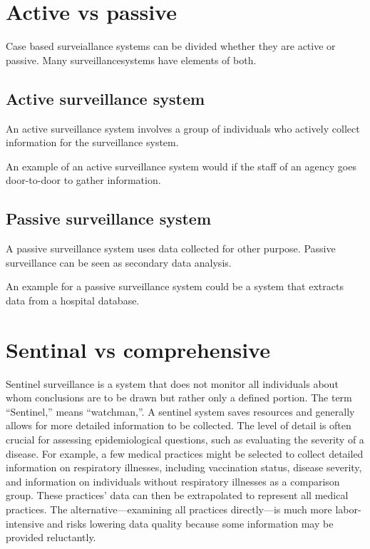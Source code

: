 \documentclass[
  letterpaper,
  DIV=11,
  numbers=noendperiod]{scrreprt}
\begin{document}
\chapter{Active vs passive}\label{active-vs-passive}

Case based surveiallance systems can be divided whether they are active
or passive. Many surveillancesystems have elements of both.

\section{Active surveillance system}\label{active-surveillance-system}

An active surveillance system involves a group of individuals who
actively collect information for the surveillance system.

An example of an active surveillance system would if the staff of an
agency goes door-to-door to gather information.

\section{Passive surveillance system}\label{passive-surveillance-system}

A passive surveillance system uses data collected for other purpose.
Passive surveillance can be seen as secondary data analysis.

An example for a passive surveillance system could be a system that
extracts data from a hospital database.

\chapter{Sentinal vs comprehensive}\label{sentinal-vs-comprehensive}

Sentinel surveillance is a system that does not monitor all individuals
about whom conclusions are to be drawn but rather only a defined
portion. The term ``Sentinel,'' means ``watchman,''. A sentinel system
saves resources and generally allows for more detailed information to be
collected. The level of detail is often crucial for assessing
epidemiological questions, such as evaluating the severity of a disease.
For example, a few medical practices might be selected to collect
detailed information on respiratory illnesses, including vaccination
status, disease severity, and information on individuals without
respiratory illnesses as a comparison group. These practices' data can
then be extrapolated to represent all medical practices. The
alternative---examining all practices directly---is much more
labor-intensive and risks lowering data quality because some information
may be provided reluctantly.
\end{document}
